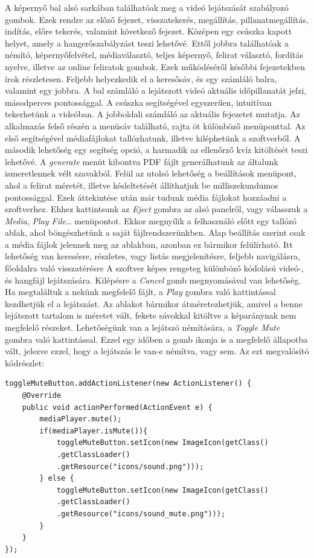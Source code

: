 A képernyő bal alsó sarkában találhatóak meg a videó lejátszását szabályozó gombok. Ezek rendre az előző fejezet, visszatekerés, megállítás, pillanatmegállítás, indítás, előre tekerés, valamint következő fejezet. Középen egy csúszka kapott helyet, amely a hangerőszabályzást teszi lehetővé. Ettől jobbra találhatóak a némító, képernyőfelvétel, médiaválasztó, teljes képernyő, felirat választó, fordítás nyelve, illetve az online feliratok gombok. Ezek működéséről későbbi fejezetekben írok részletesen. Feljebb helyezkedik el a keresősáv, és egy számláló balra, valamint egy jobbra. A bal számláló a lejátszott videó aktuális időpillanatát jelzi, másodperces pontossággal. A csúszka segítségével egyszerűen, intuitívan tekerhetünk a videóban. A jobboldali számláló az aktuális fejezetet mutatja. Az alkalmazás felső részén a menüsáv található, rajta öt különböző menüponttal. Az első segítségével médiafájlokat tallózhatunk, illetve kiléphetünk a szoftverből. A második lehetőség egy segítség opció, a harmadik az ellenőrző kvíz kitöltését teszi lehetővé. A \textit{generate} menüt kibontva PDF fájlt generálhatunk az általunk ismeretlennek vélt szavakból. Felül az utolsó lehetőség a beállítások menüpont, ahol a felirat méretét, illetve késleltetését állíthatjuk be milliszekundumos pontossággal. Ezek áttekintése után már tudunk média fájlokat hozzáadni a szoftverhez. Ehhez kattintsunk az \textit{Eject} gombra az alsó panelről, vagy válasszuk a \textit{Media}, \textit{Play File…} menüpontot. Ekkor megnyílik a felhasználó előtt egy tallózó ablak, ahol böngészhetünk a saját fájlrendszerünkben. Alap beállítás szerint csak a média fájlok jelennek meg az ablakban, azonban ez bármikor felülírható. Itt lehetőség van keresésre, részletes, vagy listás megjelenítésre, feljebb navigálásra, főoldalra való visszatérésre A szoftver képes rengeteg különböző kódolású videó-, és hangfájl lejátszására. Kilépésre a \textit{Cancel} gomb megnyomásával van lehetőség. Ha megtaláltuk a nekünk megfelelő fájlt, a \textit{Play} gombra való kattintással kezdhetjük el a lejátszást. Az ablakot bármikor átméretezhetjük, amivel a benne lejátszott tartalom is méretet vált, fekete sávokkal kitöltve a képaránynak nem megfelelő részeket. Lehetőségünk van a lejátszó némítására, a \textit{Toggle Mute} gombra való kattintással. Ezzel egy időben a gomb ikonja is a megfelelő állapotba vált, jelezve ezzel, hogy a lejátszás le van-e némítva, vagy sem. Az ezt megvalósító kódrészlet:
\begin{verbatim}
toggleMuteButton.addActionListener(new ActionListener() {
    @Override
    public void actionPerformed(ActionEvent e) {
        mediaPlayer.mute();
        if(mediaPlayer.isMute()){
            toggleMuteButton.setIcon(new ImageIcon(getClass()
            .getClassLoader()
            .getResource("icons/sound.png")));
        } else {
            toggleMuteButton.setIcon(new ImageIcon(getClass()
            .getClassLoader()
            .getResource("icons/sound_mute.png")));
        }
    }
});
\end{verbatim}

